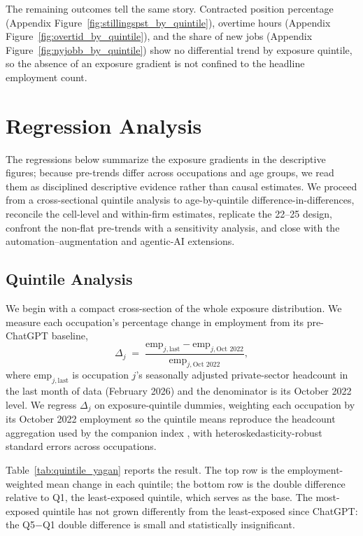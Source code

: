 \documentclass[12pt]{article}
\begin{document}
The remaining outcomes tell the same story. Contracted position percentage (Appendix Figure~\ref{fig:stillingspst_by_quintile}), overtime hours (Appendix Figure~\ref{fig:overtid_by_quintile}), and the share of new jobs (Appendix Figure~\ref{fig:nyjobb_by_quintile}) show no differential trend by exposure quintile, so the absence of an exposure gradient is not confined to the headline employment count.


\section{Regression Analysis}\label{sec:regression}

The regressions below summarize the exposure gradients in the descriptive figures; because pre-trends differ across occupations and age groups, we read them as disciplined descriptive evidence rather than causal estimates. We proceed from a cross-sectional quintile analysis to age-by-quintile difference-in-differences, reconcile the cell-level and within-firm estimates, replicate the \citet{brynjolfsson2025} 22--25 design, confront the non-flat pre-trends with a sensitivity analysis, and close with the automation--augmentation and agentic-AI extensions.

\subsection{Quintile Analysis}\label{sec:regression:quintile}

We begin with a compact cross-section of the whole exposure distribution. We measure each occupation's percentage change in employment from its pre-ChatGPT baseline,
\[
\Delta_j \;=\; \frac{\text{emp}_{j,\text{last}} - \text{emp}_{j,\text{Oct }2022}}{\text{emp}_{j,\text{Oct }2022}},
\]
where $\text{emp}_{j,\text{last}}$ is occupation $j$'s seasonally adjusted private-sector headcount in the last month of data (February 2026) and the denominator is its October 2022 level. We regress $\Delta_j$ on exposure-quintile dummies, weighting each occupation by its October 2022 employment so the quintile means reproduce the headcount aggregation used by the companion index \citep{kiindeksen2026}, with heteroskedasticity-robust standard errors across occupations.

Table~\ref{tab:quintile_yagan} reports the result. The top row is the employment-weighted mean change in each quintile; the bottom row is the double difference relative to Q1, the least-exposed quintile, which serves as the base. The most-exposed quintile has not grown differently from the least-exposed since ChatGPT: the Q5$-$Q1 double difference is small and statistically insignificant.
\end{document}
